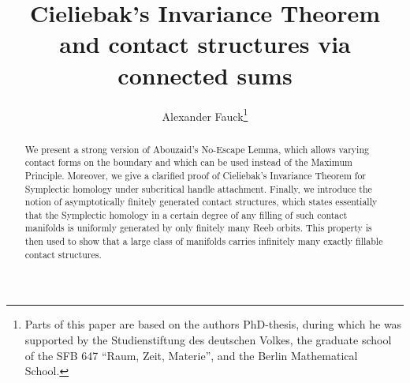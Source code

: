 \documentclass[a4paper,12pt,bibliography=totocnumbered,titlepage=false,abstracton,bookmarksnumbered=true]{scrartcl}
\title{Cieliebak's Invariance Theorem and contact structures via connected sums}
\author{Alexander Fauck\footnote{Parts of this paper are based on the authors PhD-thesis, during which he was supported by the Studienstiftung des deutschen Volkes, the graduate school of the SFB 647 ``Raum, Zeit, Materie'', and the Berlin Mathematical School.}}
\theoremstyle{definition}
\begin{document}
\maketitle

\begin{abstract}
 We present a strong version of Abouzaid's No-Escape Lemma, which allows varying contact forms on the boundary and which can be used instead of the Maximum Principle. Moreover, we give a clarified proof of Cieliebak's Invariance Theorem for Symplectic homology under subcritical handle attachment. Finally, we introduce the notion of asymptotically finitely generated contact structures, which states essentially that the Symplectic homology in a certain degree of any filling of such contact manifolds is uniformly generated by only finitely many Reeb orbits. This property is then used to show that a large class of manifolds carries infinitely many exactly fillable contact structures. 
\end{abstract}

\tableofcontents
\end{document}
